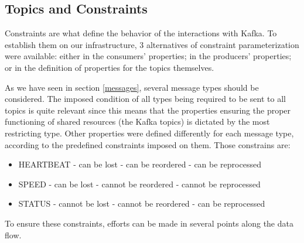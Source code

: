 \documentclass[12pt]{article}
\begin{document}
\subsection{Topics and Constraints} \label{topics} %

Constraints are what define the behavior of the interactions with Kafka.
To establish them on our infrastructure, 3 alternatives of constraint parameterization were available: 
either in the consumers' properties; in the producers' properties; or in the definition of properties for the topics themselves.

As we have seen in section \ref{messages}, several message types should be considered.
The imposed condition of all types being required to be sent to all topics is quite relevant since this means that the properties ensuring the proper functioning 
of shared resources (the Kafka topics) is dictated by the most restricting type. 
Other properties were defined differently for each message type, according to the predefined constraints imposed on them.
Those constrains are:
\vspace{-10pt}
\begin{multicols}{3}
  \begin{itemize}
    \item HEARTBEAT
    \newline - can be lost
    \newline - can be reordered
    \newline - can be reprocessed
  \end{itemize}
  \columnbreak
  \begin{itemize}
    \item SPEED
    \newline - can be lost
    \newline - cannot be reordered
    \newline - cannot be reprocessed
  \end{itemize}
  \columnbreak
  \begin{itemize}
    \item STATUS
    \newline - cannot be lost
    \newline - cannot be reordered
    \newline - can be reprocessed
  \end{itemize}
\end{multicols}
\vspace{-10pt}
To ensure these constraints, efforts can be made in several points along the data flow.
\end{document}
